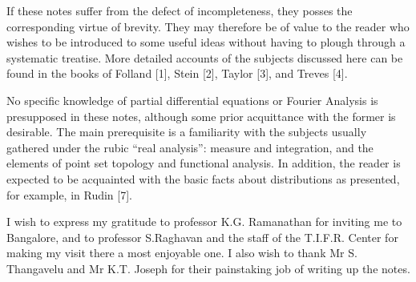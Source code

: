 	If these notes suffer from the defect of incompleteness, they
        posses the corresponding virtue of brevity. They may therefore
        be of value to the reader who wishes to be introduced to some
        useful ideas without having to plough through a systematic
        treatise. More detailed accounts of the subjects discussed here
        can be found in the books of Folland [1], Stein [2],
        Taylor [3], and Treves [4]. 

No specific knowledge of partial differential equations or Fourier
Analysis is presupposed in these notes, although some prior
acquittance with the former is desirable. The main prerequisite is a
familiarity with the subjects usually gathered under the
rubic ``real analysis'': measure and integration, and the elements of point set
topology and functional analysis. In addition, the reader is expected
to be acquainted with the basic facts about distributions as presented,
for example, in Rudin [7]. 

I wish to express my gratitude to professor K.G. Ramanathan for
inviting me to Bangalore, and to professor S.Raghavan and the staff of
the T.I.F.R. Center for making my visit there a most enjoyable
one. I also wish to thank Mr S. Thangavelu and Mr K.T. Joseph for
their painstaking job of writing up the notes. 


